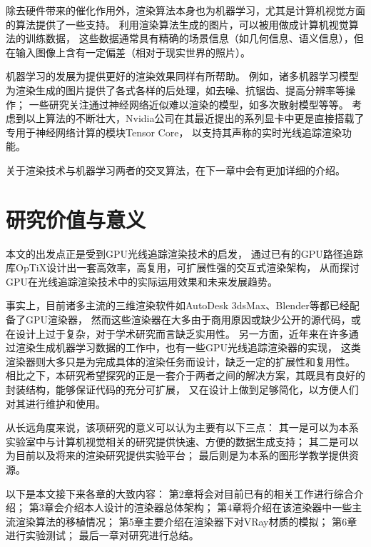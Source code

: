 除去硬件带来的催化作用外，渲染算法本身也为机器学习，尤其是计算机视觉方面的算法提供了一些支持。
利用渲染算法生成的图片，可以被用做成计算机视觉算法的训练数据，
这些数据通常具有精确的场景信息（如几何信息、语义信息），但在输入图像上含有一定偏差（相对于现实世界的照片）。

机器学习的发展为提供更好的渲染效果同样有所帮助。
例如，诸多机器学习模型为渲染生成的图片提供了各式各样的后处理，如去噪、抗锯齿、提高分辨率等操作；
一些研究关注通过神经网络近似难以渲染的模型，如多次散射模型等等。
考虑到以上算法的不断壮大，Nvidia公司在其最近提出的系列显卡中更是直接搭载了专用于神经网络计算的模块Tensor Core\cite{RTX}，
以支持其声称的实时光线追踪渲染功能。

关于渲染技术与机器学习两者的交叉算法，在下一章中会有更加详细的介绍。

\section{研究价值与意义}

本文的出发点正是受到GPU光线追踪渲染技术的启发，
通过已有的GPU路径追踪库OpTiX设计出一套高效率，高复用，可扩展性强的交互式渲染架构，
从而探讨GPU在光线追踪渲染技术中的实际运用效果和未来发展趋势。

事实上，目前诸多主流的三维渲染软件如AutoDesk 3dsMax、Blender等都已经配备了GPU渲染器，
然而这些渲染器在大多由于商用原因或缺少公开的源代码，或在设计上过于复杂，对于学术研究而言缺乏实用性。
另一方面，近年来在许多通过渲染生成机器学习数据的工作中，也有一些GPU光线追踪渲染器的实现，
这类渲染器则大多只是为完成具体的渲染任务而设计，缺乏一定的扩展性和复用性。
相比之下，本研究希望探究的正是一套介于两者之间的解决方案，其既具有良好的封装结构，能够保证代码的充分可扩展，
又在设计上做到足够简化，以方便人们对其进行维护和使用。

从长远角度来说，该项研究的意义可以认为主要有以下三点：
其一是可以为本系实验室中与计算机视觉相关的研究提供快速、方便的数据生成支持；
其二是可以为目前以及将来的渲染研究提供实验平台；
最后则是为本系的图形学教学提供资源。

以下是本文接下来各章的大致内容：
第2章将会对目前已有的相关工作进行综合介绍；
第3章会介绍本人设计的渲染器总体架构；
第4章将介绍在该渲染器中一些主流渲染算法的移植情况；
第5章主要介绍在渲染器下对VRay材质的模拟；
第6章进行实验测试；
最后一章对研究进行总结。






